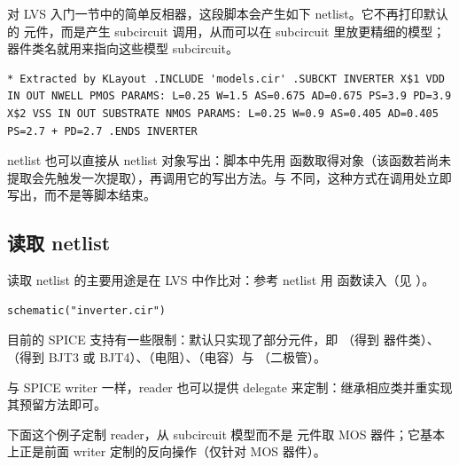 对 LVS 入门一节中的简单反相器，这段脚本会产生如下 netlist。它不再打印默认的  元件，而是产生 subcircuit 调用，从而可以在 subcircuit 里放更精细的模型；器件类名就用来指向这些模型 subcircuit。

\begin{lstlisting}
* Extracted by KLayout .INCLUDE 'models.cir' .SUBCKT INVERTER X$1 VDD IN OUT NWELL PMOS PARAMS: L=0.25 W=1.5 AS=0.675 AD=0.675 PS=3.9 PD=3.9 X$2 VSS IN OUT SUBSTRATE NMOS PARAMS: L=0.25 W=0.9 AS=0.405 AD=0.405 PS=2.7 + PD=2.7 .ENDS INVERTER
\end{lstlisting}

netlist 也可以直接从 netlist 对象写出：脚本中先用  函数取得对象（该函数若尚未提取会先触发一次提取），再调用它的写出方法。与  不同，这种方式在调用处立即写出，而不是等脚本结束。

\subsection{读取 netlist}

读取 netlist 的主要用途是在 LVS 中作比对：参考 netlist 用  函数读入（见 ）。

\begin{lstlisting}
schematic("inverter.cir")
\end{lstlisting}

目前的 SPICE 支持有一些限制：默认只实现了部分元件，即 （得到  器件类）、（得到 BJT3 或 BJT4）、（电阻）、（电容）与 （二极管）。

与 SPICE writer 一样，reader 也可以提供 delegate 来定制：继承相应类并重实现其预留方法即可。

下面这个例子定制 reader，从 subcircuit 模型而不是  元件取 MOS 器件；它基本上正是前面 writer 定制的反向操作（仅针对 MOS 器件）。

